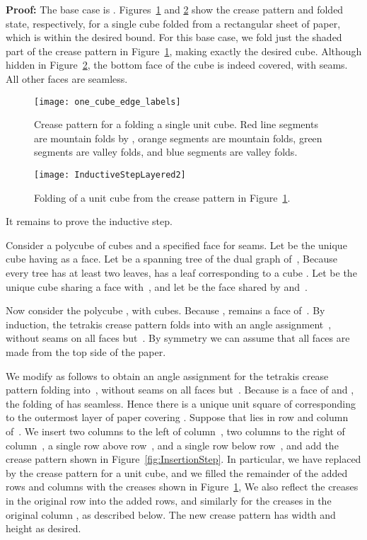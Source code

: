 \documentclass[11pt]{article}
\newcommand{\figlab}[1]{\label{fig:#1}}
\newcommand{\figref}[1]{\ref{fig:#1}}
\newenvironment{proof}{\noindent\textbf{Proof: }\ignorespaces}
  {\hspace*{\fill}\medskip}
\begin{document}
\begin{proof}
  The base case is .
  Figures~\figref{OneCubeCrease} and \figref{Extrusion} show the crease
  pattern and folded state, respectively, for a single cube folded from a
   rectangular sheet of paper, which is within the desired bound.
  For this base case, we fold just the shaded  part of the crease
  pattern in Figure~\figref{OneCubeCrease}, making exactly the desired cube.
  Although hidden in Figure~\figref{Extrusion}, the bottom face of the
  cube is indeed covered, with seams.  All other faces are seamless.

\begin{figure}
\centering
\texttt{[image: one\_cube\_edge\_labels]}
\caption{Crease pattern for a folding a single unit cube.  Red line segments
  are mountain folds by , orange segments are  mountain
  folds, green segments are  valley folds, and blue segments are
   valley folds.}
\figlab{OneCubeCrease}
\end{figure}


\begin{figure}
\centering
\texttt{[image: InductiveStepLayered2]}
\caption{Folding of a unit cube from the crease pattern
         in Figure~\protect\figref{OneCubeCrease}.}
\figlab{Extrusion}
\end{figure}


  It remains to prove the inductive step.

  Consider a polycube  of  cubes
  and a specified face  for seams.
  Let  be the unique cube having  as a face.
  Let  be a spanning tree of the dual graph of~,
  Because every tree has at least two leaves,
   has a leaf corresponding to a cube .
  Let  be the unique cube sharing a face with~,
  and let  be the face shared by  and~.

  Now consider the polycube , with  cubes.
  Because ,  remains a face of~.
  By induction, the  tetrakis crease pattern
  folds  into  with an angle assignment~,
  without seams on all faces but~.
  By symmetry we can assume that all faces are made
  from the top side of the paper.

  We modify  as follows to obtain an angle assignment  for the
   tetrakis crease pattern  folding into~,
  without seams on all faces but~.
  Because  is a face of  and ,
  the folding of  has  seamless.
  Hence there is a unique unit square  of 
  corresponding to the outermost layer of paper covering .
  Suppose that  lies in row  and column  of~.
  We insert two columns to the left of column~, two columns to the right of
  column~, a single row above row~, and a single row below row~,
  and add the crease pattern shown in Figure~\figref{InsertionStep}.
  In particular, we have replaced  by the  crease pattern for a
  unit cube, and we filled the remainder of the added rows and columns
  with the creases shown in Figure~\figref{OneCubeCrease},
  We also reflect the creases in the original row  into the added rows,
  and similarly for the creases in the original column , as described below.
  The new crease pattern  has width 
  and height  as desired.


\end{proof}
\end{document}
